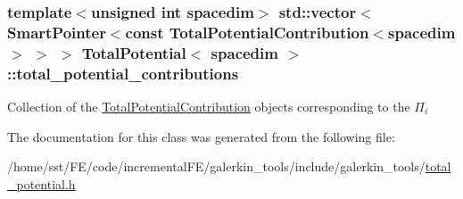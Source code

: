 \subsubsection[{\texorpdfstring{total\+\_\+potential\+\_\+contributions}{total_potential_contributions}}]{\setlength{\rightskip}{0pt plus 5cm}template$<$unsigned int spacedim$>$ std\+::vector$<$ {\bf Smart\+Pointer}$<$const {\bf Total\+Potential\+Contribution}$<$spacedim$>$ $>$ $>$ {\bf Total\+Potential}$<$ spacedim $>$\+::total\+\_\+potential\+\_\+contributions\hspace{0.3cm}{\ttfamily [private]}}\hypertarget{class_total_potential_a5a14ce0e2fabf8116566aa67fb11db35}{}\label{class_total_potential_a5a14ce0e2fabf8116566aa67fb11db35}
Collection of the \hyperlink{class_total_potential_contribution}{Total\+Potential\+Contribution} objects corresponding to the $\Pi_i$ 

The documentation for this class was generated from the following file\+:\begin{DoxyCompactItemize}
\item 
/home/sst/\+F\+E/code/incremental\+F\+E/galerkin\+\_\+tools/include/galerkin\+\_\+tools/\hyperlink{total__potential_8h}{total\+\_\+potential.\+h}\end{DoxyCompactItemize}
